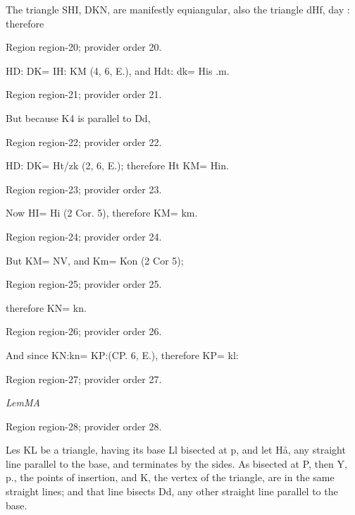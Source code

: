 \documentclass[11pt]{article}
\begin{document}
The triangle SHI, DKN, are manifestly equiangular, also the triangle dHf, day : therefore
\par

{\scriptsize\color{gray} Region region-20; provider order 20.\par}
\medskip

HD: DK= IH: KM (4, 6, E.), and Hdt: dk= His .m.
\par

{\scriptsize\color{gray} Region region-21; provider order 21.\par}
\medskip

But because K4 is parallel to Dd,
\par

{\scriptsize\color{gray} Region region-22; provider order 22.\par}
\medskip

HD: DK= Ht/zk (2, 6, E.); therefore Ht KM= Hin.
\par

{\scriptsize\color{gray} Region region-23; provider order 23.\par}
\medskip

Now HI= Hi (2 Cor. 5), therefore KM= km.
\par

{\scriptsize\color{gray} Region region-24; provider order 24.\par}
\medskip

But KM= NV, and Km= Kon (2 Cor 5);
\par

{\scriptsize\color{gray} Region region-25; provider order 25.\par}
\medskip

therefore KN= kn.
\par

{\scriptsize\color{gray} Region region-26; provider order 26.\par}
\medskip

And since KN:kn= KP:(CP. 6, E.), therefore KP= kl:
\par

{\scriptsize\color{gray} Region region-27; provider order 27.\par}
\medskip

{\small\itshape LemMA\par}

{\scriptsize\color{gray} Region region-28; provider order 28.\par}
\medskip

Les KL be a triangle, having its base Ll bisected at p, and let Hå, any straight line parallel to the base, and terminates by the sides. As bisected at P, then Y, p., the points of insertion, and K, the vertex of the triangle, are in the same straight lines; and that line bisects Dd, any other straight line parallel to the base.
\par
\end{document}
